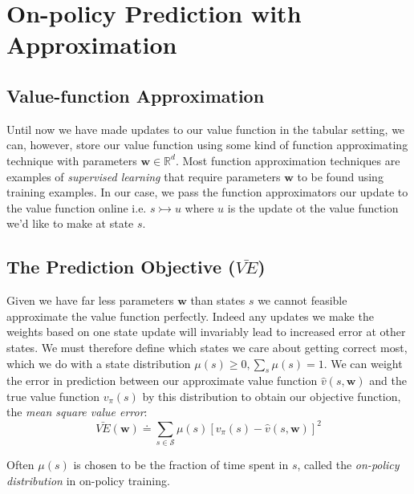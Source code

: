 \section{On-policy Prediction with Approximation}
\subsection{Value-function Approximation}
Until now we have made updates to our value function in the tabular setting, we can, however, store our value function using some kind of function approximating technique with parameters $\textbf{w} \in \mathbb{R}^d$. Most function approximation techniques are examples of \textit{supervised learning} that require parameters $\textbf{w}$ to be found using training examples. In our case, we pass the function approximators our update to the value function online i.e. $s \rightarrowtail u$ where $u$ is the update ot the value function we'd like to make at state $s$.

\subsection{The Prediction Objective ($\bar{VE}$)}
Given we have far less parameters $\textbf{w}$ than states $s$ we cannot feasible approximate the value function perfectly. Indeed any updates we make the weights based on one state update will invariably lead to increased error at other states. We must therefore define which states we care about getting correct most, which we do with a state distribution $\mu(s) \geq 0, \sum_{s}\mu(s) = 1$. We can weight the error in prediction between our approximate value function $\hat{v}(s, \textbf{w})$ and the true value function $v_\pi(s)$ by this distribution to obtain our objective function, the \textit{mean square value error}:
\begin{equation}
\bar{VE}(\textbf{w}) \doteq \sum_{s \in \mathcal{S}} \mu(s)\left[v_\pi(s) - \hat{v}(s, \textbf{w})\right]^2
\end{equation}

Often $\mu(s)$ is chosen to be the fraction of time spent in $s$, called the \textit{on-policy distribution} in on-policy training.

